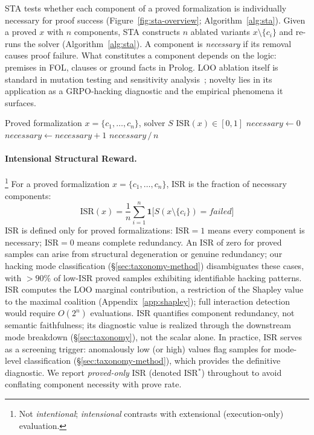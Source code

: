 STA tests whether each component of a proved formalization is individually necessary for proof success (Figure~\ref{fig:sta-overview}; Algorithm~\ref{alg:sta}).
Given a proved $x$ with $n$ components, STA constructs $n$ ablated variants $x\setminus\{c_i\}$ and re-runs the solver (Algorithm~\ref{alg:sta}).
A component is \emph{necessary} if its removal causes proof failure.
What constitutes a component depends on the logic: premises in FOL, clauses or ground facts in Prolog.
LOO ablation itself is standard in mutation testing and sensitivity analysis~\citep{demillo1978, jia-harman-survey}; novelty lies in its application as a GRPO-hacking diagnostic and the empirical phenomena it surfaces.

\begin{algorithm}[t]
\caption{Solver Trace Ablation (STA)}
\label{alg:sta}
\begin{algorithmic}[1]
\REQUIRE Proved formalization $x = \{c_1, \ldots, c_n\}$, solver $S$
\ENSURE $\text{ISR}(x) \in [0, 1]$
\STATE $\textit{necessary} \gets 0$
        \STATE $\textit{necessary} \gets \textit{necessary} + 1$
    \ENDIF
\ENDFOR
\RETURN $\textit{necessary} \,/\, n$
\end{algorithmic}
\end{algorithm}

\paragraph{Intensional Structural Reward.}\footnote{Not \emph{intentional}; \emph{intensional} contrasts with extensional (execution-only) evaluation.}
For a proved formalization $x = \{c_1, \ldots, c_n\}$, ISR is the fraction of necessary components:
\begin{equation}
  \text{ISR}(x) = \frac{1}{n}\sum_{i=1}^{n}\mathbf{1}\bigl[S(x\setminus\{c_i\})=\textit{failed}\bigr]
  \label{eq:isr}
\end{equation}
ISR is defined only for proved formalizations: ISR${=}1$ means every component is necessary; ISR${=}0$ means complete redundancy.
An ISR of zero for proved samples can arise from structural degeneration or genuine redundancy; our hacking mode classification (\S\ref{sec:taxonomy-method}) disambiguates these cases, with ${>}90\%$ of low-ISR proved samples exhibiting identifiable hacking patterns.
ISR computes the LOO marginal contribution, a restriction of the Shapley value to the maximal coalition (Appendix~\ref{app:shapley}); full interaction detection would require $O(2^n)$ evaluations.
ISR quantifies component redundancy, not semantic faithfulness; its diagnostic value is realized through the downstream mode breakdown (\S\ref{sec:taxonomy}), not the scalar alone.
In practice, ISR serves as a screening trigger: anomalously low (or high) values flag samples for mode-level classification (\S\ref{sec:taxonomy-method}), which provides the definitive diagnostic.
We report \emph{proved-only} ISR (denoted ISR$^*$) throughout to avoid conflating component necessity with prove rate.

